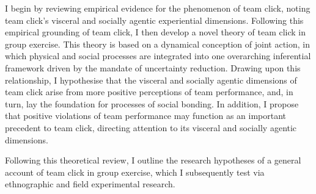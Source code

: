 \begin{CJK}{UTF8}{gbsn}
I begin by reviewing empirical evidence for the phenomenon of team click, noting team click's visceral and socially agentic experiential dimensions.  Following this empirical grounding of team click, I then develop a novel theory of team click in group exercise.  This theory is based on a dynamical conception of joint action, in which physical and social processes are integrated into one overarching inferential framework driven by the mandate of uncertainty reduction.  Drawing upon this relationship, I hypothesise that the visceral and socially agentic dimensions of team click arise from more positive perceptions of team performance, and, in turn, lay the foundation for processes of social bonding. In addition, I propose that positive violations of team performance may function as an important precedent to team click, directing attention to its visceral and socially agentic dimensions.

Following this theoretical review, I outline the research hypotheses of a general account of team click in group exercise, which I subsequently test via ethnographic and field experimental research.







\end{CJK}
